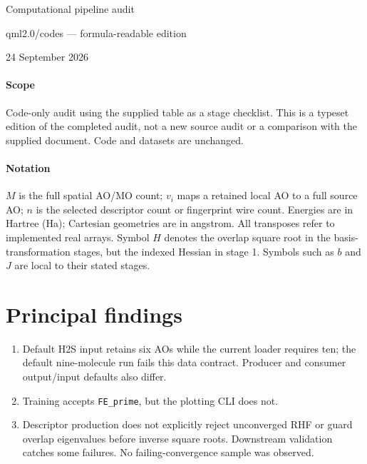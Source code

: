 \documentclass[10pt,a4paper]{article}
\begin{document}
{\LARGE\sffamily\color{navy} Computational pipeline audit}\par
{\large qml2.0/codes --- formula-readable edition}\par
24 September 2026
\paragraph{Scope} Code-only audit using the supplied table as a stage checklist. This is a typeset edition of the completed audit, not a new source audit or a comparison with the supplied document. Code and datasets are unchanged.
\paragraph{Notation} $M$ is the full spatial AO/MO count; $v_i$ maps a retained local AO to a full source AO; $n$ is the selected descriptor count or fingerprint wire count. Energies are in Hartree (Ha); Cartesian geometries are in angstrom. All transposes refer to implemented real arrays. Symbol $H$ denotes the overlap square root in the basis-transformation stages, but the indexed Hessian in stage 1. Symbols such as $b$ and $J$ are local to their stated stages.
\section*{Principal findings}
\begin{enumerate}
\item Default H2S input retains six AOs while the current loader requires ten; the default nine-molecule run fails this data contract. Producer and consumer output/input defaults also differ.
\item Training accepts \texttt{FE\_prime}, but the plotting CLI does not.
\item Descriptor production does not explicitly reject unconverged RHF or guard overlap eigenvalues before inverse square roots. Downstream validation catches some failures. No failing-convergence sample was observed.
\end{enumerate}
\end{document}
